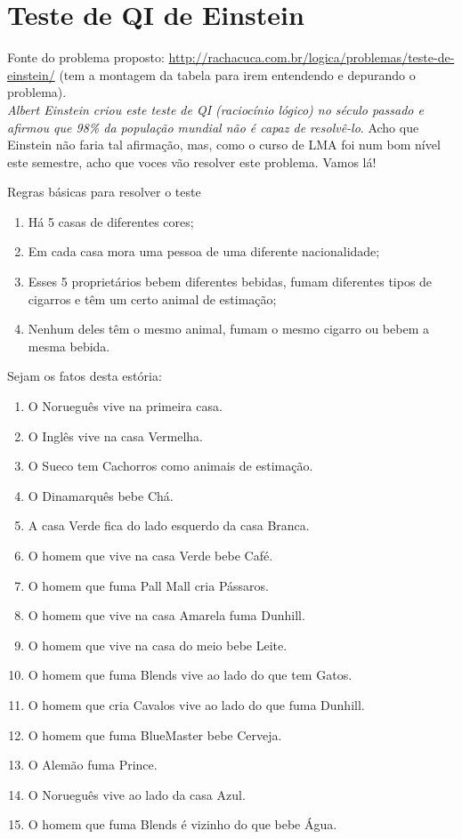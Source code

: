 \documentclass[a4paper,12pt]{article}
\begin{document}
\newpage
\section{Teste de QI de Einstein}

 Fonte do problema proposto:
 \url{http://rachacuca.com.br/logica/problemas/teste-de-einstein/}
 (tem a montagem da tabela para irem entendendo e depurando o problema).\\

{\em Albert Einstein criou este teste de QI (raciocínio lógico) no século 
  passado e afirmou que 98\% da população mundial não é capaz de resolvê-lo}. 
Acho que Einstein não
faria tal afirmação, mas,  como o curso de LMA foi num bom nível este
semestre, acho que voces vão resolver este problema. Vamos lá!

Regras básicas para resolver o teste
\begin{enumerate}
\item Há 5 casas de diferentes cores;
\item Em cada casa mora uma pessoa de uma diferente nacionalidade;
\item Esses 5 proprietários bebem diferentes bebidas, fumam diferentes
      tipos de cigarros e têm um certo animal de estimação;
\item Nenhum deles têm o mesmo animal, fumam o mesmo cigarro ou bebem a mesma bebida.

\end{enumerate}


Sejam os fatos desta estória:
\begin{enumerate}
\item    O Norueguês vive na primeira casa.
\item    O Inglês vive na casa Vermelha.
\item    O Sueco tem Cachorros como animais de estimação.
\item    O Dinamarquês bebe Chá.
\item    A casa Verde fica do lado esquerdo da casa Branca.
\item    O homem que vive na casa Verde bebe Café.
\item    O homem que fuma Pall Mall cria Pássaros.
\item    O homem que vive na casa Amarela fuma Dunhill.
\item    O homem que vive na casa do meio bebe Leite.
\item    O homem que fuma Blends vive ao lado do que tem Gatos.
\item    O homem que cria Cavalos vive ao lado do que fuma Dunhill.
\item    O homem que fuma BlueMaster bebe Cerveja.
\item    O Alemão fuma Prince.
\item    O Norueguês vive ao lado da casa Azul.
\item    O homem que fuma Blends é vizinho do que bebe Água.
   
\end{enumerate}
\end{document}

